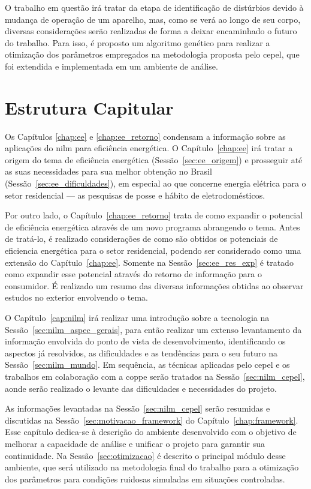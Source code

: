 O trabalho em questão irá tratar da etapa de identificação de
distúrbios devido à mudança de operação de um aparelho, mas, como se
verá ao longo de seu corpo, diversas considerações serão realizadas de
forma a deixar encaminhado o futuro do trabalho. Para isso, é proposto
um algoritmo genético para realizar a otimização dos parâmetros
empregados na metodologia proposta pelo \acs{cepel}, que foi extendida
e implementada em um ambiente de análise.

\section{Estrutura Capitular}

Os Capítulos \ref{chap:ee} e \ref{chap:ee_retorno} condensam a
informação sobre as aplicações do \acs{nilm} para eficiência
energética. O Capítulo~\ref{chap:ee} irá tratar a origem do tema de
eficiência energética (Sessão~\ref{sec:ee_origem}) e prosseguir até as
suas necessidades para sua melhor obtenção no Brasil
(Sessão~\ref{sec:ee_dificuldades}), em especial ao que concerne
energia elétrica para o setor residencial --- as pesquisas de posse e
hábito de eletrodomésticos.

Por outro lado, o Capítulo~\ref{chap:ee_retorno} trata de como
expandir o potencial de eficiência energética através de um novo
programa abrangendo o tema. Antes de tratá-lo, é realizado
considerações de como são obtidos os potenciais de eficiencia
energética para o setor residencial, podendo ser considerado como uma
extensão do Capítulo~\ref{chap:ee}. Somente na
Sessão~\ref{sec:ee_res_exp} é tratado como expandir esse potencial
através do retorno de informação para o consumidor. É realizado um
resumo das diversas informações obtidas ao observar estudos no
exterior envolvendo o tema.

O Capítulo~\ref{cap:nilm} irá realizar uma introdução sobre a
tecnologia na Sessão~\ref{sec:nilm_aspec_gerais}, para então realizar
um extenso levantamento da informação envolvida do ponto de vista de
desenvolvimento, identificando os aspectos já resolvidos, as
dificuldades e as tendências para o seu futuro na
Sessão~\ref{sec:nilm_mundo}. Em sequência, as técnicas aplicadas pelo
\acs{cepel} e os trabalhos em colaboração com a \acs{coppe} serão
tratados na Sessão~\ref{sec:nilm_cepel}, aonde serão realizado o
levante das dificuldades e necessidades do projeto.

As informações levantadas na Sessão~\ref{sec:nilm_cepel} serão
resumidas e discutidas na Sessão~\ref{sec:motivacao_framework} do
Capítulo~\ref{chap:framework}. Esse capítulo dedica-se à descrição do
ambiente desenvolvido com o objetivo de melhorar a capacidade de
análise e unificar o projeto para garantir sua continuidade. Na
Sessão~\ref{sec:otimizacao} é descrito o principal módulo desse
ambiente, que será utilizado na metodologia final do trabalho para a
otimização dos parâmetros para condições ruidosas simuladas em
situações controladas.

